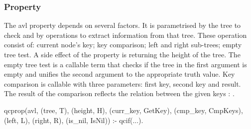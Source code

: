 

\subsubsection*{Property}


The avl property depends on several factors.
%
It is parame\-trised by the tree to check and by operations to extract
information from that tree.
%
These operation consist of: current node's key; key comparison; left and
right sub-trees; empty tree test.
%
A side effect of the property is returning the height of the tree.
%
The empty tree test is a callable term that checks if the tree in the
first argument is empty and unifies the second argument to the
appropriate truth value.
%
Key comparison is callable with three parameters: first key, second key
and result.
%
The result of the comparison reflects the relation between the given
keys : .
%
\begin{yapcode}
 qcprop({avl, (tree, T), (height, H),
      (curr_key, GetKey), (cmp_key, CmpKeys),
      (left, L), (right, R),
      (is_nil, IsNil)}) :- 
   qcif(...).
\end{yapcode}


